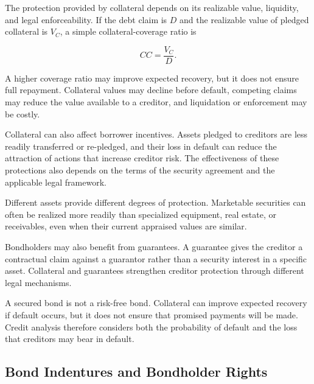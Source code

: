 The protection provided by collateral depends on its realizable value, liquidity, and legal enforceability. If the debt claim is $D$ and the realizable value of pledged collateral is $V_C$, a simple collateral-coverage ratio is

\begin{equation}
CC=\frac{V_C}{D}.
\label{eq:ch8-collateral-coverage}
\end{equation}

A higher coverage ratio may improve expected recovery, but it does not ensure full repayment. Collateral values may decline before default, competing claims may reduce the value available to a creditor, and liquidation or enforcement may be costly.

Collateral can also affect borrower incentives. Assets pledged to creditors are less readily transferred or re-pledged, and their loss in default can reduce the attraction of actions that increase creditor risk. The effectiveness of these protections also depends on the terms of the security agreement and the applicable legal framework.

Different assets provide different degrees of protection. Marketable securities can often be realized more readily than specialized equipment, real estate, or receivables, even when their current appraised values are similar.

Bondholders may also benefit from guarantees. A guarantee gives the creditor a contractual claim against a guarantor rather than a security interest in a specific asset. Collateral and guarantees strengthen creditor protection through different legal mechanisms.

\begin{tcolorbox}[
  enhanced,
  breakable,
  colback=white,
  colframe=FinanceBlue,
  boxrule=0.7pt,
  sharp corners,
  borderline west={2.2pt}{0pt}{FinanceBlue},
  title=\textbf{Financial Perspective: A Secured Bond Is Not risk-free},
  coltitle=white,
  colbacktitle=FinanceBlue,
  fonttitle=\bfseries,
  before skip=1.2em,
  after skip=1.2em
]

A secured bond is not a risk-free bond. Collateral can improve expected recovery if default occurs, but it does not ensure that promised payments will be made. Credit analysis therefore considers both the probability of default and the loss that creditors may bear in default.

\end{tcolorbox}

\subsection{Bond Indentures and Bondholder Rights}

